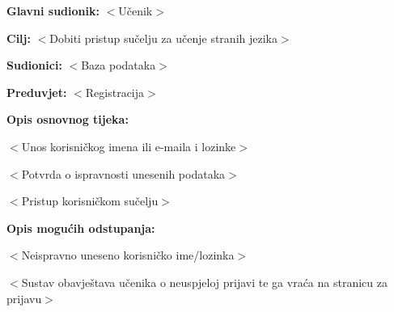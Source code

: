 					\noindent {}
					\begin{packed_item}
	
						\item \textbf{Glavni sudionik: }$<$Učenik$>$
						\item  \textbf{Cilj:} $<$Dobiti pristup sučelju za učenje stranih jezika$>$
						\item  \textbf{Sudionici:} $<$Baza podataka$>$
						\item  \textbf{Preduvjet:} $<$Registracija$>$
						\item  \textbf{Opis osnovnog tijeka:}
						
						\item[] \begin{packed_enum}
	
							\item $<$Unos korisničkog imena ili e-maila i lozinke$>$
							\item $<$Potvrda o ispravnosti unesenih podataka$>$
							\item $<$Pristup korisničkom sučelju$>$
						\end{packed_enum}
						
						\item  \textbf{Opis mogućih odstupanja:}
						
						\item[] \begin{packed_item}
	
							\item[2.a] $<$Neispravno uneseno korisničko ime/lozinka$>$
							\item[] \begin{packed_enum}
								
								\item $<$Sustav obavještava učenika o neuspjeloj prijavi te ga vraća na stranicu za prijavu$>$
								
							\end{packed_enum}
							
						\end{packed_item}
					\end{packed_item}


